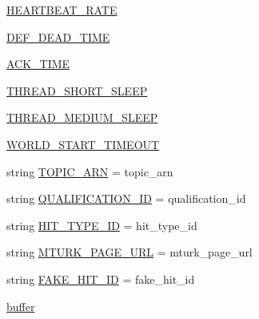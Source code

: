 \begin{DoxyCompactItemize}
\item 
\hyperlink{namespaceparlai_1_1mturk_1_1core_1_1legacy__2018_1_1test_1_1test__full__system_a439a51358fa1049d8abe1851c63239da}{H\+E\+A\+R\+T\+B\+E\+A\+T\+\_\+\+R\+A\+TE}
\item 
\hyperlink{namespaceparlai_1_1mturk_1_1core_1_1legacy__2018_1_1test_1_1test__full__system_ab63cd9dae62522ef34edb1acc7501d60}{D\+E\+F\+\_\+\+D\+E\+A\+D\+\_\+\+T\+I\+ME}
\item 
\hyperlink{namespaceparlai_1_1mturk_1_1core_1_1legacy__2018_1_1test_1_1test__full__system_ae0d03de1dad53898c3b20827d55cdbaa}{A\+C\+K\+\_\+\+T\+I\+ME}
\item 
\hyperlink{namespaceparlai_1_1mturk_1_1core_1_1legacy__2018_1_1test_1_1test__full__system_a3beed1fb09e4f31513178447b30ebbcb}{T\+H\+R\+E\+A\+D\+\_\+\+S\+H\+O\+R\+T\+\_\+\+S\+L\+E\+EP}
\item 
\hyperlink{namespaceparlai_1_1mturk_1_1core_1_1legacy__2018_1_1test_1_1test__full__system_a4f7df381f02c4b67469c1c0541806c10}{T\+H\+R\+E\+A\+D\+\_\+\+M\+E\+D\+I\+U\+M\+\_\+\+S\+L\+E\+EP}
\item 
\hyperlink{namespaceparlai_1_1mturk_1_1core_1_1legacy__2018_1_1test_1_1test__full__system_afd372f770da33c569d1d1cc61f777917}{W\+O\+R\+L\+D\+\_\+\+S\+T\+A\+R\+T\+\_\+\+T\+I\+M\+E\+O\+UT}
\item 
string \hyperlink{namespaceparlai_1_1mturk_1_1core_1_1legacy__2018_1_1test_1_1test__full__system_a24e16e507a65654d9586d01aedd51c76}{T\+O\+P\+I\+C\+\_\+\+A\+RN} = \textquotesingle{}topic\+\_\+arn\textquotesingle{}
\item 
string \hyperlink{namespaceparlai_1_1mturk_1_1core_1_1legacy__2018_1_1test_1_1test__full__system_a3715b8a07a4edb690de091d68fcd2091}{Q\+U\+A\+L\+I\+F\+I\+C\+A\+T\+I\+O\+N\+\_\+\+ID} = \textquotesingle{}qualification\+\_\+id\textquotesingle{}
\item 
string \hyperlink{namespaceparlai_1_1mturk_1_1core_1_1legacy__2018_1_1test_1_1test__full__system_a3b42fc36ac11b8b42de7a6e7003cf5e6}{H\+I\+T\+\_\+\+T\+Y\+P\+E\+\_\+\+ID} = \textquotesingle{}hit\+\_\+type\+\_\+id\textquotesingle{}
\item 
string \hyperlink{namespaceparlai_1_1mturk_1_1core_1_1legacy__2018_1_1test_1_1test__full__system_a33fe338b451f6eed589994f83cb7d1f8}{M\+T\+U\+R\+K\+\_\+\+P\+A\+G\+E\+\_\+\+U\+RL} = \textquotesingle{}mturk\+\_\+page\+\_\+url\textquotesingle{}
\item 
string \hyperlink{namespaceparlai_1_1mturk_1_1core_1_1legacy__2018_1_1test_1_1test__full__system_a714bc7a7599388bacf7d255257355d25}{F\+A\+K\+E\+\_\+\+H\+I\+T\+\_\+\+ID} = \textquotesingle{}fake\+\_\+hit\+\_\+id\textquotesingle{}
\item 
\hyperlink{namespaceparlai_1_1mturk_1_1core_1_1legacy__2018_1_1test_1_1test__full__system_a37b9b8b73968dafd1bad016368042618}{buffer}
\end{DoxyCompactItemize}


